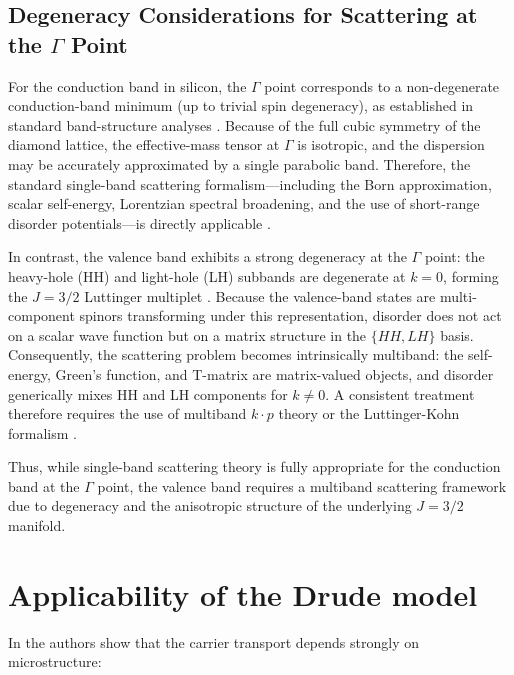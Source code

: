 \subsection{Degeneracy Considerations for Scattering at the $\Gamma$ Point}

For the conduction band in silicon, the $\Gamma$ point corresponds to a 
non-degenerate conduction-band minimum (up to trivial spin degeneracy), as 
established in standard band-structure analyses \cite{Kittel2005,YuCardona2010}.  
Because of the full cubic symmetry of the diamond lattice, the effective-mass 
tensor at $\Gamma$ is isotropic, and the dispersion may be accurately 
approximated by a single parabolic band.  
Therefore, the standard single-band scattering formalism---including the 
Born approximation, scalar self-energy, Lorentzian spectral broadening, and 
the use of short-range disorder potentials---is directly applicable 
\cite{Mahan2000,Economou2006}.

In contrast, the valence band exhibits a strong degeneracy at the 
$\Gamma$ point: the heavy-hole (HH) and light-hole (LH) subbands are 
degenerate at $k=0$, forming the $J=3/2$ Luttinger multiplet 
\cite{Luttinger1956,Dresselhaus2008}.  
Because the valence-band states are multi-component spinors transforming 
under this representation, disorder does not act on a scalar wave function 
but on a matrix structure in the $\{HH, LH\}$ basis.  
Consequently, the scattering problem becomes intrinsically multiband: the 
self-energy, Green's function, and T-matrix are matrix-valued objects, and 
disorder generically mixes HH and LH components for $k\neq0$.  
A consistent treatment therefore requires the use of multiband $k\cdot p$ 
theory or the Luttinger-Kohn formalism \cite{YuCardona2010,Luttinger1956}.

Thus, while single-band scattering theory is fully appropriate for the 
conduction band at the $\Gamma$ point, the valence band requires a 
multiband scattering framework due to degeneracy and the anisotropic 
structure of the underlying $J=3/2$ manifold.






\section{Applicability of the Drude model}



In \cite{PhysRevB.79.115306} the authors show that the carrier transport depends strongly on microstructure:

